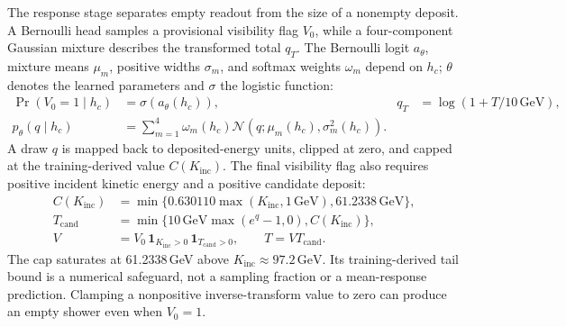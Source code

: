 \documentclass[11pt]{article}
\newcommand{\GeV}{\,\mathrm{GeV}}
\newcommand{\Kinc}{K_{\mathrm{inc}}}
\begin{document}
The response stage separates empty readout from the size of a nonempty deposit. A Bernoulli head samples a provisional visibility flag $V_0$, while a four-component Gaussian mixture describes the transformed total $q_T$. The Bernoulli logit $a_\theta$, mixture means $\mu_m$, positive widths $\sigma_m$, and softmax weights $\omega_m$ depend on $h_c$; $\theta$ denotes the learned parameters and $\sigma$ the logistic function:
\begin{equation}
 \begin{aligned}
 \Pr(V_0=1\mid h_c)&=\sigma(a_\theta(h_c)),
 &q_T&=\log(1+T/10\GeV),\\
 p_\theta(q\mid h_c)&=\sum_{m=1}^{4}\omega_m(h_c)
 \mathcal N\!\left(q;\mu_m(h_c),\sigma_m^2(h_c)\right).
 \end{aligned}
 \label{eq:response_transform}
\end{equation}
A draw $q$ is mapped back to deposited-energy units, clipped at zero, and capped at the training-derived value $C(\Kinc)$. The final visibility flag also requires positive incident kinetic energy and a positive candidate deposit:
\begin{equation}
 \begin{aligned}
 C(\Kinc)&=\min\{0.630110\max(\Kinc,1\GeV),61.2338\GeV\},\\
 T_{\mathrm{cand}}&=\min\{10\GeV\max(e^q-1,0),C(\Kinc)\},\\
 V&=V_0\,\mathbf 1_{\Kinc>0}\,\mathbf 1_{T_{\mathrm{cand}}>0},
 \qquad T=VT_{\mathrm{cand}}.
 \end{aligned}
 \label{eq:cap}
\end{equation}
The cap saturates at 61.2338\,GeV above $\Kinc\approx97.2\GeV$. Its training-derived tail bound is a numerical safeguard, not a sampling fraction or a mean-response prediction. Clamping a nonpositive inverse-transform value to zero can produce an empty shower even when $V_0=1$.
\end{document}

